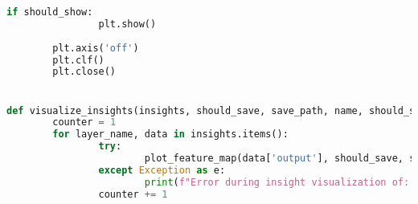 \begin{lstlisting}[language=Python,caption=Hooking insight informations from Mask R-CNN, label=lst:inference-insight]
		if should_show:
				plt.show()
		
		plt.axis('off')
		plt.clf()
		plt.close()


def visualize_insights(insights, should_save, save_path, name, should_show, max_aspect_ratio=5.0, max_cols=3, channel_limit=3, batch_limit=1):
		counter = 1
		for layer_name, data in insights.items():
				try:
						plot_feature_map(data['output'], should_save, save_path, should_show, title=f"{name}_{counter:02}_{layer_name}")
				except Exception as e:
						print(f"Error during insight visualization of: {layer_name} with error: {e} and tensor: {data['output'].size()}")
				counter += 1
	\end{lstlisting}
	\fi
	


